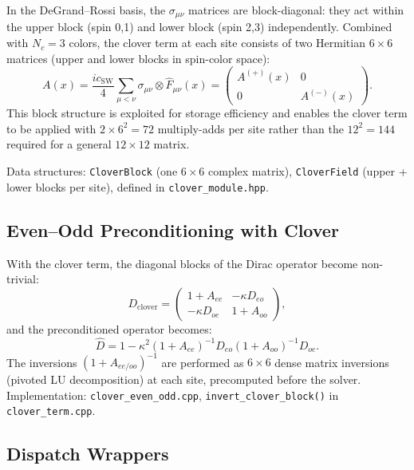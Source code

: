 \documentclass[12pt]{article}
\newcommand{\code}[1]{\texttt{#1}}
\begin{document}
In the DeGrand--Rossi basis, the $\sigma_{\mu\nu}$ matrices are block-diagonal: they act within the upper block (spin 0,1) and lower block (spin 2,3) independently. Combined with $N_c = 3$ colors, the clover term at each site consists of two Hermitian $6 \times 6$ matrices (upper and lower blocks in spin-color space):
\begin{equation}
A(x) = \frac{i c_{\mathrm{SW}}}{4} \sum_{\mu < \nu} \sigma_{\mu\nu} \otimes \hat{F}_{\mu\nu}(x) = \begin{pmatrix} A^{(+)}(x) & 0 \\ 0 & A^{(-)}(x) \end{pmatrix}.
\end{equation}
This block structure is exploited for storage efficiency and enables the clover term to be applied with $2 \times 6^2 = 72$ multiply-adds per site rather than the $12^2 = 144$ required for a general $12 \times 12$ matrix.

Data structures: \code{CloverBlock} (one $6 \times 6$ complex matrix), \code{CloverField} (upper + lower blocks per site), defined in \code{clover\_module.hpp}.

\subsection{Even--Odd Preconditioning with Clover}

With the clover term, the diagonal blocks of the Dirac operator become non-trivial:
\begin{equation}
D_{\mathrm{clover}} = \begin{pmatrix} 1 + A_{ee} & -\kappa D_{eo} \\ -\kappa D_{oe} & 1 + A_{oo} \end{pmatrix},
\end{equation}
and the preconditioned operator becomes:
\begin{equation}
\hat{D} = 1 - \kappa^2 (1 + A_{ee})^{-1} D_{eo} (1 + A_{oo})^{-1} D_{oe}.
\end{equation}
The inversions $(1 + A_{ee/oo})^{-1}$ are performed as $6 \times 6$ dense matrix inversions (pivoted LU decomposition) at each site, precomputed before the solver. Implementation: \code{clover\_even\_odd.cpp}, \code{invert\_clover\_block()} in \code{clover\_term.cpp}.

\subsection{Dispatch Wrappers}
\end{document}
